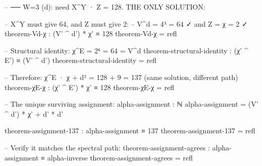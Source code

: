 \documentclass[11pt,a4paper]{article}
\begin{document}
\begin{code}
-- ── W=3 (d): need X^Y · Z = 128. THE ONLY SOLUTION:

-- X^Y must give 64, and Z must give 2:
-- V^d = 4³ = 64 ✓  and  Z = χ = 2 ✓
theorem-Vd-χ : (V' ^ d') * χ' ≡ 128
theorem-Vd-χ = refl

-- Structural identity: χ^E = 2⁶ = 64 = V^d
theorem-structural-identity : (χ' ^ E') ≡ (V' ^ d')
theorem-structural-identity = refl

-- Therefore: χ^E · χ + d² = 128 + 9 = 137 (same solution, different path)
theorem-χE-χ : (χ' ^ E') * χ' ≡ 128
theorem-χE-χ = refl

-- The unique surviving assignment:
alpha-assignment : ℕ
alpha-assignment = (V' ^ d') * χ' + d' * d'

theorem-assignment-137 : alpha-assignment ≡ 137
theorem-assignment-137 = refl

-- Verify it matches the spectral path:
theorem-assignment-agrees : alpha-assignment ≡ alpha-inverse
theorem-assignment-agrees = refl
\end{code}
\end{document}

